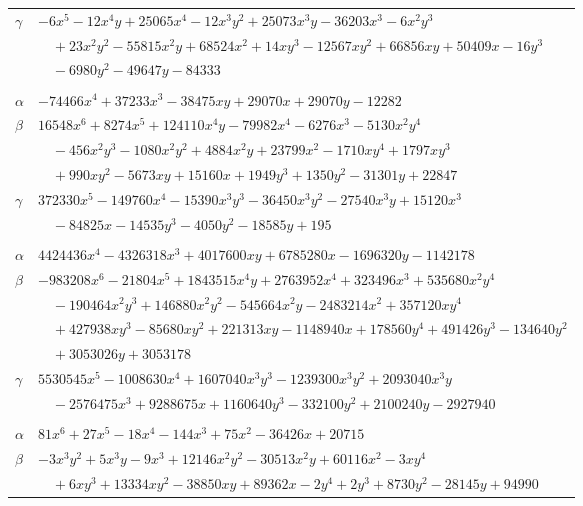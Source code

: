\documentclass[11pt]{article}
\begin{document}
\begin{longtable}{@{}ll@{}}
$\gamma$ & $-6x^{5}-12x^{4}y+25065x^{4}-12x^{3}y^{2}+25073x^{3}y-36203x^{3}-6x^{2}y^{3}$\\
 & $\quad +23x^{2}y^{2}-55815x^{2}y+68524x^{2}+14xy^{3}-12567xy^{2}+66856xy+50409x-16y^{3}$\\
 & $\quad -6980y^{2}-49647y-84333$\\
\addlinespace[3pt]
\multicolumn{2}{@{}l}{$\{i,j\}=\{84,85\}$, $k_{ij}=2^{2}\cdot 3^{2}\cdot 5^{3}\cdot 7$}\\
$\alpha$ & $-74466x^{4}+37233x^{3}-38475xy+29070x+29070y-12282$\\
$\beta$ & $16548x^{6}+8274x^{5}+124110x^{4}y-79982x^{4}-6276x^{3}-5130x^{2}y^{4}$\\
 & $\quad -456x^{2}y^{3}-1080x^{2}y^{2}+4884x^{2}y+23799x^{2}-1710xy^{4}+1797xy^{3}$\\
 & $\quad +990xy^{2}-5673xy+15160x+1949y^{3}+1350y^{2}-31301y+22847$\\
$\gamma$ & $372330x^{5}-149760x^{4}-15390x^{3}y^{3}-36450x^{3}y^{2}-27540x^{3}y+15120x^{3}$\\
 & $\quad -84825x-14535y^{3}-4050y^{2}-18585y+195$\\
\addlinespace[3pt]
\multicolumn{2}{@{}l}{$\{i,j\}=\{84,86\}$, $k_{ij}=2^{3}\cdot 3^{2}\cdot 5^{3}\cdot 7^{2}\cdot 13$}\\
$\alpha$ & $4424436x^{4}-4326318x^{3}+4017600xy+6785280x-1696320y-1142178$\\
$\beta$ & $-983208x^{6}-21804x^{5}+1843515x^{4}y+2763952x^{4}+323496x^{3}+535680x^{2}y^{4}$\\
 & $\quad -190464x^{2}y^{3}+146880x^{2}y^{2}-545664x^{2}y-2483214x^{2}+357120xy^{4}$\\
 & $\quad +427938xy^{3}-85680xy^{2}+221313xy-1148940x+178560y^{4}+491426y^{3}-134640y^{2}$\\
 & $\quad +3053026y+3053178$\\
$\gamma$ & $5530545x^{5}-1008630x^{4}+1607040x^{3}y^{3}-1239300x^{3}y^{2}+2093040x^{3}y$\\
 & $\quad -2576475x^{3}+9288675x+1160640y^{3}-332100y^{2}+2100240y-2927940$\\
\addlinespace[3pt]
\multicolumn{2}{@{}l}{$\{i,j\}=\{84,88\}$, $k_{ij}=2^{4}\cdot 3\cdot 7^{3}\cdot 13$}\\
$\alpha$ & $81x^{6}+27x^{5}-18x^{4}-144x^{3}+75x^{2}-36426x+20715$\\
$\beta$ & $-3x^{3}y^{2}+5x^{3}y-9x^{3}+12146x^{2}y^{2}-30513x^{2}y+60116x^{2}-3xy^{4}$\\
 & $\quad +6xy^{3}+13334xy^{2}-38850xy+89362x-2y^{4}+2y^{3}+8730y^{2}-28145y+94990$\\

\end{longtable}
\end{document}
